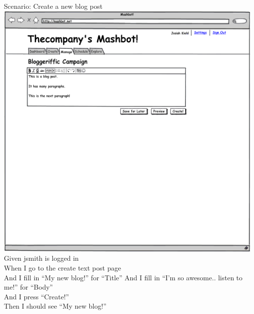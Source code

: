 \documentclass[12pt]{article}
\begin{document}
\begin{hangparas}{0.25in}{1}
Scenario: Create a new blog post \\
\includegraphics[width=\textwidth]{../mockups/manage-create-blog-post.png}
  Given jsmith is logged in \\
  When I go to the create text post page \\
  And I fill in ``My new blog!'' for ``Title''
  And I fill in ``I'm so awesome.. listen to me!'' for ``Body'' \\
  And I press ``Create!'' \\
  Then I should see ``My new blog!'' \\
  

\end{hangparas}
\end{document}

